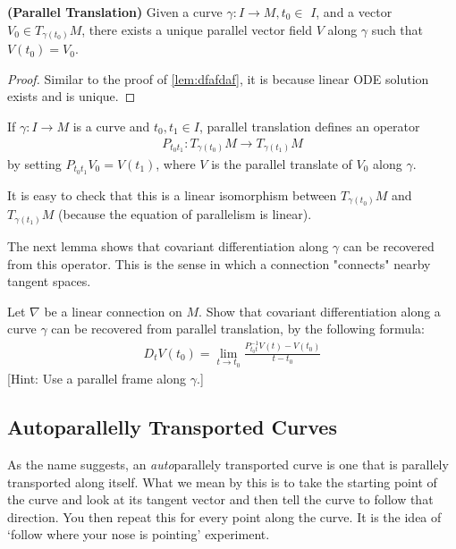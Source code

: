 \documentclass[12pt]{article} %
\newcommand{\bfs}[1]{\textbf{({#1}) }}
\begin{document}
\begin{thma}\bfs{Parallel Translation}
  Given a curve $\gamma: I \rightarrow M, t_{0} \in$ $I$, and a vector $V_{0} \in T_{\gamma\left(t_{0}\right)} M$, there exists a unique parallel vector field $V$ along $\gamma$ such that $V\left(t_{0}\right)=V_{0}$.
\end{thma}
\begin{proof}
    Similar to the proof of \cref{lem:dfafdaf}, it is because linear ODE solution exists and is unique.
\end{proof}
\begin{defa}
If $\gamma: I \rightarrow M$ is a curve and $t_{0}, t_{1} \in I$, parallel translation defines an operator
\begin{align*}
P_{t_{0} t_{1}}: T_{\gamma\left(t_{0}\right)} M \rightarrow T_{\gamma\left(t_{1}\right)} M
\end{align*}
 by setting $P_{t_{0} t_{1}} V_{0}=V\left(t_{1}\right)$, where $V$ is the parallel translate of $V_{0}$ along $\gamma$. 
\end{defa}

 \begin{lema}
   It is easy to check that this is a linear isomorphism between $T_{\gamma\left(t_{0}\right)} M$ and $T_{\gamma\left(t_{1}\right)} M$ (because the equation of parallelism is linear). 
 \end{lema}
 The next lemma shows that covariant differentiation along $\gamma$ can be recovered from this operator. This is the sense in which a connection "connects" nearby tangent spaces.
\begin{lema}
Let $\nabla$ be a linear connection on $M$. Show that covariant differentiation along a curve $\gamma$ can be recovered from parallel translation, by the following formula:
\begin{align*}
D_{t} V\left(t_{0}\right)=\lim _{t \rightarrow t_{0}} \frac{P_{t_{0} t}^{-1} V(t)-V\left(t_{0}\right)}{t-t_{0}}
\end{align*}
[Hint: Use a parallel frame along $\gamma$.]
\end{lema}
 
 
\subsection{Autoparallelly Transported Curves}
As the name suggests, an \textit{auto}parallely transported curve is one that is parallely transported along itself. What we mean by this is to take the starting point of the curve and look at its tangent vector and then tell the curve to follow that direction. You then repeat this for every point along the curve. It is the idea of `follow where your nose is pointing' experiment. 
\end{document}
